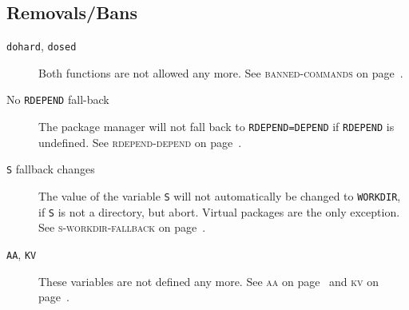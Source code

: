 \documentclass[a4paper,notumble]{leaflet}
\newcommand{\code}[1]{\texttt{#1}}
\newcommand{\featureref}[1]{\textsc{#1} on page~\pageref{feat:#1}}
\begin{document}
\subsection{Removals/Bans}
\label{sec:cs:eapi4-removalsbans}
\begin{description}
    \item[\code{dohard}, \code{dosed}] Both functions are not allowed
    any more.  See \featureref{banned-commands}.
    \item[No \code{RDEPEND} fall-back] The package manager will not
    fall back to \code{RDEPEND=DEPEND} if \code{RDEPEND} is undefined.
    See \featureref{rdepend-depend}.
    \item[\code{S} fallback changes] The value of the variable
    \code{S} will not automatically be changed to \code{WORKDIR}, if
    \code{S} is not a directory, but abort.  Virtual packages are the
    only exception.  See \featureref{s-workdir-fallback}.
    \item[\code{AA}, \code{KV}] These variables are not defined
    any more.  See \featureref{aa} and \featureref{kv}.
\end{description}
\end{document}
